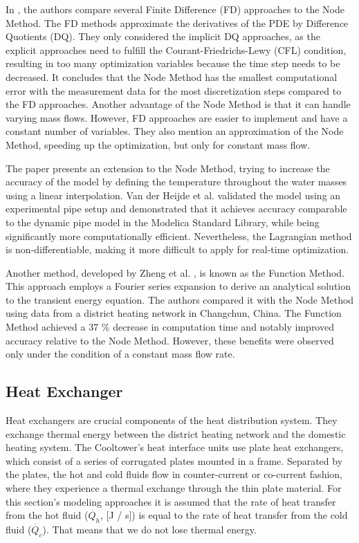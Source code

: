 In \cite{MAURER2021244}, the authors compare several Finite Difference (FD) approaches to the Node Method. The FD methods approximate the derivatives of the PDE by Difference Quotients (DQ). They only considered the implicit DQ approaches, as the explicit approaches need to fulfill the Courant-Friedrichs-Lewy (CFL) condition, resulting in too many optimization variables because the time step needs to be decreased. It concludes that the Node Method has the smallest computational error with the measurement data for the most discretization steps compared to the FD approaches. Another advantage of the Node Method is that it can handle varying mass flows. However, FD approaches are easier to implement and have a constant number of variables. They also mention an approximation of the Node Method, speeding up the optimization, but only for constant mass flow.

The paper \cite{OPPELT2016336} presents an extension to the Node Method, trying to increase the accuracy of the model by defining the temperature throughout the water masses using a linear interpolation. Van der Heijde et al. \cite{VANDERHEIJDE2017158} validated the model using an experimental pipe setup and demonstrated that it achieves accuracy comparable to the dynamic pipe model in the Modelica Standard Library, while being significantly more computationally efficient. Nevertheless, the Lagrangian method is non-differentiable, making it more difficult to apply for real-time optimization. 

Another method, developed by Zheng et al. \cite{ZHENG2017682}, is known as the Function Method. This approach employs a Fourier series expansion to derive an analytical solution to the transient energy equation. The authors compared it with the Node Method using data from a district heating network in Changchun, China. The Function Method achieved a 37 \% decrease in computation time and notably improved accuracy relative to the Node Method. However, these benefits were observed only under the condition of a constant mass flow rate. 

\subsection{Heat Exchanger}
Heat exchangers are crucial components of the heat distribution system. They exchange thermal energy between the district heating network and the domestic heating system. The Cooltower's heat interface units use plate heat exchangers, which consist of a series of corrugated plates mounted in a frame. Separated by the plates, the hot and cold fluids flow in counter-current or co-current fashion, where they experience a thermal exchange through the thin plate material. 
For this section's modeling approaches it is assumed that the rate of heat transfer from the hot fluid ($\dot{Q_{h}}$, [J / s]) is equal to the rate of heat transfer from the cold fluid ($\dot{Q_{c}}$). That means that we do not lose thermal energy. 

